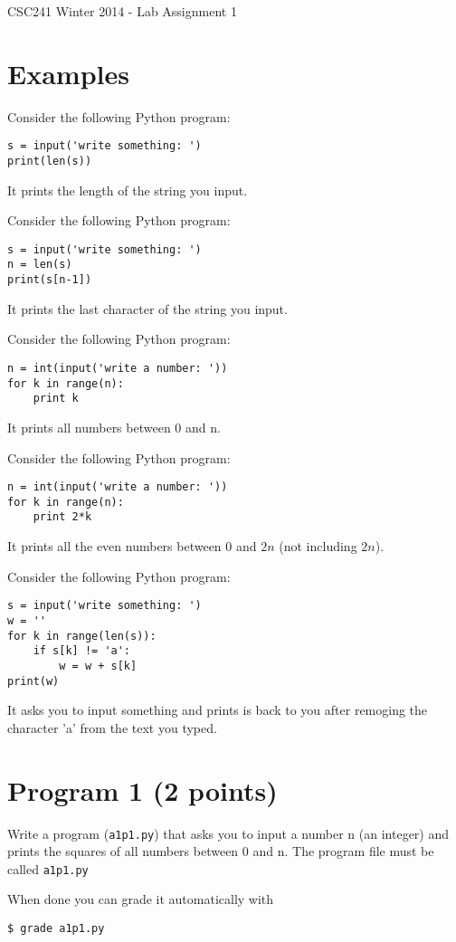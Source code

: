 \documentclass[12pt]{article}
\begin{document}
{\Large CSC241 Winter 2014 - Lab Assignment 1}

\section{Examples}

\noindent Consider the following Python program:
\begin{verbatim}
s = input('write something: ')
print(len(s))
\end{verbatim}
\noindent It prints the length of the string you input.

\noindent Consider the following Python program:
\begin{verbatim}
s = input('write something: ')
n = len(s)
print(s[n-1])
\end{verbatim}
\noindent It prints the last character of the string you input.

\noindent Consider the following Python program:
\begin{verbatim}
n = int(input('write a number: '))
for k in range(n):
    print k
\end{verbatim}
\noindent It prints all numbers between 0 and n.

\noindent Consider the following Python program:
\begin{verbatim}
n = int(input('write a number: '))
for k in range(n):
    print 2*k
\end{verbatim}
It prints all the even numbers between 0 and $2n$ (not including $2n$).

\noindent Consider the following Python program:
\begin{verbatim}
s = input('write something: ')
w = ''
for k in range(len(s)):
    if s[k] != 'a':
        w = w + s[k]
print(w)
\end{verbatim}
It asks you to input something and prints is back to you after remoging the character 'a' from the text you typed.

\section{Program 1 (2 points)}

\noindent Write a program ({\tt a1p1.py}) 
that asks you to input a number n (an integer)
and prints the squares of all numbers between 0 and n.
The program file must be called {\tt a1p1.py}

\noindent When done you can grade it automatically with
\begin{verbatim}
$ grade a1p1.py
\end{verbatim}
\end{document}
